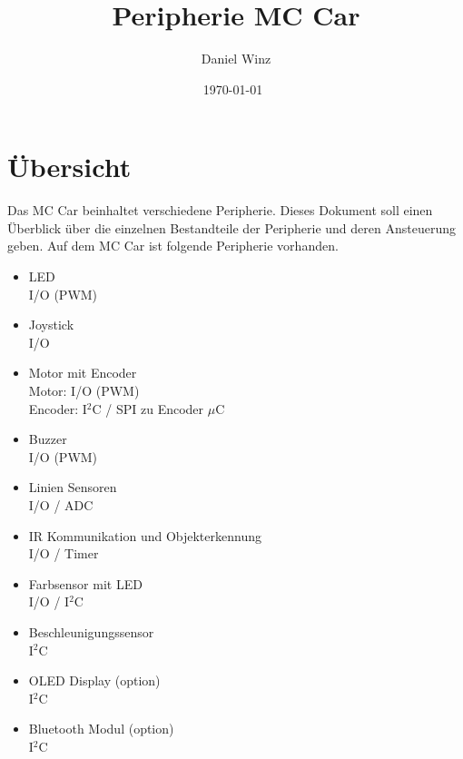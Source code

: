 \documentclass[a4paper,10pt,fleqn]{article}
\title{Peripherie MC Car}
\author{Daniel Winz}
\date{\today~\dtc}
\begin{document}
\maketitle

\newpage

\tableofcontents

\newpage

\section{Übersicht}
Das MC Car beinhaltet verschiedene Peripherie. Dieses Dokument soll einen 
Überblick über die einzelnen Bestandteile der Peripherie und deren Ansteuerung 
geben. Auf dem MC Car ist folgende Peripherie vorhanden. 
\begin{itemize}
  \item LED \\
        I/O (PWM)
  \item Joystick \\
        I/O
  \item Motor mit Encoder \\
        Motor: I/O (PWM) \\
        Encoder: I$^2$C / SPI zu Encoder $\mu$C
  \item Buzzer \\
        I/O (PWM)
  \item Linien Sensoren \\
        I/O / ADC
  \item IR Kommunikation und Objekterkennung \\
        I/O / Timer
  \item Farbsensor mit LED \\
        I/O / I$^2$C
  \item Beschleunigungssensor \\
        I$^2$C
  \item OLED Display (option) \\
        I$^2$C
  \item Bluetooth Modul (option) \\
        I$^2$C
\end{itemize}
\end{document}
